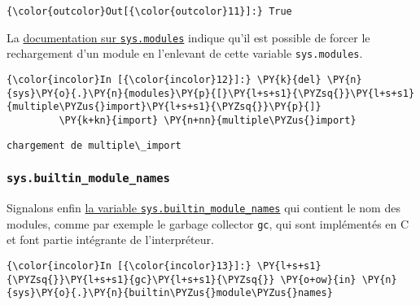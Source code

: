 \begin{Verbatim}[commandchars=\\\{\},frame=single,framerule=0.3mm,rulecolor=\color{cellframecolor}]
{\color{outcolor}Out[{\color{outcolor}11}]:} True
\end{Verbatim}
            
    La
\href{https://docs.python.org/3/library/sys.html\#sys.modules}{documentation
sur \texttt{sys.modules}} indique qu'il est possible de forcer le
rechargement d'un module en l'enlevant de cette variable
\texttt{sys.modules}.

    \begin{Verbatim}[commandchars=\\\{\},frame=single,framerule=0.3mm,rulecolor=\color{cellframecolor}]
{\color{incolor}In [{\color{incolor}12}]:} \PY{k}{del} \PY{n}{sys}\PY{o}{.}\PY{n}{modules}\PY{p}{[}\PY{l+s+s1}{\PYZsq{}}\PY{l+s+s1}{multiple\PYZus{}import}\PY{l+s+s1}{\PYZsq{}}\PY{p}{]}
         \PY{k+kn}{import} \PY{n+nn}{multiple\PYZus{}import}
\end{Verbatim}


    \begin{Verbatim}[commandchars=\\\{\},frame=single,framerule=0.3mm,rulecolor=\color{cellframecolor}]
chargement de multiple\_import
\end{Verbatim}

    \hypertarget{sys.builtin_module_names}{%
\subsubsection{\texorpdfstring{\texttt{sys.builtin\_module\_names}}{sys.builtin\_module\_names}}\label{sys.builtin_module_names}}

    Signalons enfin
\href{https://docs.python.org/3/library/sys.html\#sys.builtin_module_names}{la
variable \texttt{sys.builtin\_module\_names}} qui contient le nom des
modules, comme par exemple le garbage collector \texttt{gc}, qui sont
implémentés en C et font partie intégrante de l'interpréteur.

    \begin{Verbatim}[commandchars=\\\{\},frame=single,framerule=0.3mm,rulecolor=\color{cellframecolor}]
{\color{incolor}In [{\color{incolor}13}]:} \PY{l+s+s1}{\PYZsq{}}\PY{l+s+s1}{gc}\PY{l+s+s1}{\PYZsq{}} \PY{o+ow}{in} \PY{n}{sys}\PY{o}{.}\PY{n}{builtin\PYZus{}module\PYZus{}names}
\end{Verbatim}


